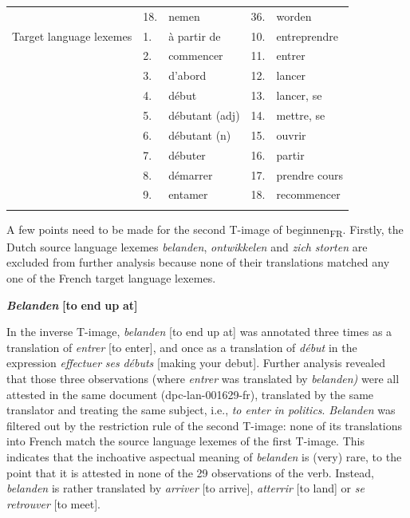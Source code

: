 \begin{table}
\begin{tabularx}{\textwidth}{p{}lXlX}
\rowcolor{lsLightGray}& 18.& nemen & 36.& worden \\
Target language lexemes & 1.& à partir de & 10.& entreprendre\\
& 2.& commencer & 11.& entrer\\
& 3.& d'abord & 12.& lancer\\
& 4.& début & 13.& lancer, se\\
& 5.& débutant (adj) & 14.& mettre, se\\
& 6.& débutant (n) & 15.& ouvrir\\
& 7.& débuter & 16.& partir\\
& 8.& démarrer & 17.& prendre cours\\
& 9.& entamer & 18.& recommencer\\
\lspbottomrule
\end{tabularx}
\end{table}


A few points need to be made for the second T-image of beginnen\textsubscript{FR}. Firstly, the Dutch source language lexemes \textit{belanden}, \textit{ontwikkelen} and \textit{zich} \textit{storten} are excluded from further analysis because none of their translations matched any one of the French target language lexemes.

\textbf{\textit{Belanden}} \textbf{[to} \textbf{end} \textbf{up} \textbf{at]}

In the inverse T-image, \textit{belanden} [to end up at] was annotated three times as a translation of \textit{entrer} [to enter], and once as a translation of \textit{début} in the expression \textit{effectuer} \textit{ses} \textit{débuts} [making your debut]. Further analysis revealed that those three observations (where \textit{entrer} was translated by \textit{belanden)} were all attested in the same document (dpc-lan-001629-fr), translated by the same translator and treating the same subject, i.e., \textit{to enter in politics}. \textit{Belanden} was filtered out by the restriction rule of the second T-image: none of its translations into French match the source language lexemes of the first T-image. This indicates that the inchoative aspectual meaning of \textit{belanden} is (very) rare, to the point that it is attested in none of the 29 observations of the verb. Instead, \textit{belanden} is rather translated by \textit{arriver} [to arrive], \textit{atterrir} [to land] or \textit{se} \textit{retrouver} [to meet].

